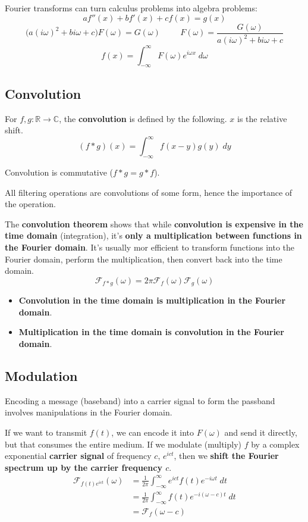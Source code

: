 \documentclass[a4paper, 11pt]{article}
\begin{document}
{    Fourier transforms can turn calculus problems into algebra problems:
    \[af''(x) + bf'(x) + cf(x) = g(x)\]
    \[\Big(a(i\omega)^2 + bi\omega + c\Big)F(\omega) = G(\omega) \hspace{1cm} F(\omega) = \frac{G(\omega)}{a(i\omega)^2 + bi\omega + c}\]
    \[f(x) = \int_{-\infty}^\infty{F(\omega) e^{i\omega x}\;d\omega}\]

    \subsection*{Convolution}
    {
        For \(f,g : \mathbb{R} \rightarrow \mathbb{C}\), the \textbf{convolution} is defined by the following. \(x\) is the relative shift.
        \[(f * g)(x) = \int_{-\infty}^\infty{f(x-y)g(y)\;dy}\]

        Convolution is commutative (\(f*g = g*f\)).

        All filtering operations are convolutions of some form, hence the importance of the operation.

        The \textbf{convolution theorem} shows that while \textbf{convolution is expensive in the time domain} (integration), it's \textbf{only a multiplication between functions in the Fourier domain}. It's usually mor efficient to transform functions into the Fourier domain, perform the multiplication, then convert back into the time domain.
        \[\mathcal{F}_{f*g}(\omega) = 2\pi \mathcal{F}_f(\omega) \mathcal{F}_g(\omega)\]

        \begin{itemize}
        \item \textbf{Convolution in the time domain is multiplication in the Fourier domain}.
        \item \textbf{Multiplication in the time domain is convolution in the Fourier domain}.
        \end{itemize}
    }
    \subsection*{Modulation}
    {
        Encoding a message (baseband) into a carrier signal to form the passband involves manipulations in the Fourier domain.

        If we want to transmit \(f(t)\), we can encode it into \(F(\omega)\) and send it directly, but that consumes the entire medium. If we modulate (multiply) \(f\) by a complex exponential \textbf{carrier signal} of frequency \(c\), \(e^{ict}\), then we \textbf{shift the Fourier spectrum up by the carrier frequency \(c\)}.
        \begin{align*}
        \mathcal{F}_{f(t)e^{ict}}(\omega) &= \frac{1}{2\pi}\int_{-\infty}^\infty{e^{ict}f(t)e^{-i\omega t}\;dt} \\
                                          &= \frac{1}{2\pi}\int_{-\infty}^\infty{f(t)e^{-i(\omega-c)t}\;dt} \\
                                          &= \mathcal{F}_f(\omega - c)
        \end{align*}

}}
\end{document}
